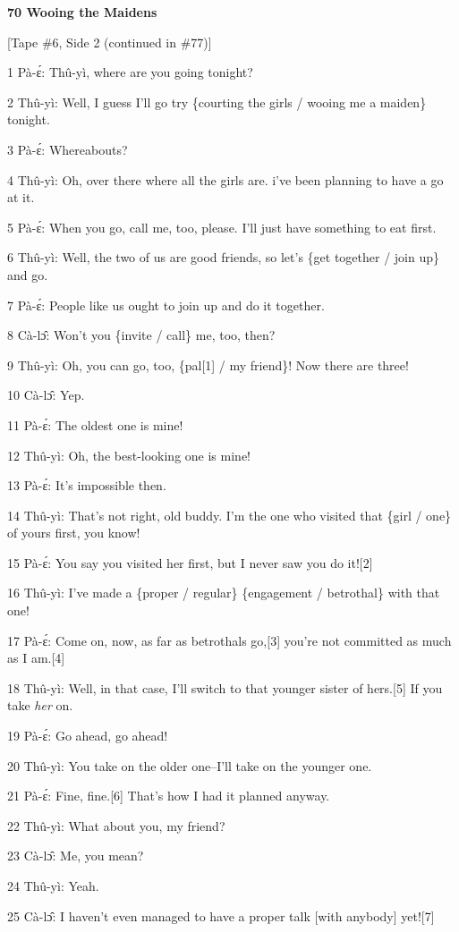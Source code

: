 
\textbf{70 Wooing the Maidens}

[Tape \#6, Side 2 (continued in \#77)]

1 Pà-ɛ́: Thû-yì, where are you going tonight?

2 Thû-yì: Well, I guess I'll go try \{courting the girls / wooing me a maiden\}
tonight.

3 Pà-ɛ́: Whereabouts?

4 Thû-yì: Oh, over there where all the girls are. i've been planning to have
a go at it.

5 Pà-ɛ́: When you go, call me, too, please. I'll just have something to eat
first.

6 Thû-yì: Well, the two of us are good friends, so let's \{get together / join
up\} and go.

7 Pà-ɛ́: People like us ought to join up and do it together.

8 Cà-lɔ̂: Won't you \{invite / call\} me, too, then?

9 Thû-yì: Oh, you can go, too, \{pal[1] / my friend\}! Now there are three!

10 Cà-lɔ̂: Yep.

11 Pà-ɛ́: The oldest one is mine!

12 Thû-yì: Oh, the best-looking one is mine!

13 Pà-ɛ́: It's impossible then.

14 Thû-yì: That's not right, old buddy. I'm the one who visited that \{girl /
one\} of yours first, you know!

15 Pà-ɛ́: You say you visited her first, but I never saw you do it![2]

16 Thû-yì: I've made a \{proper / regular\} \{engagement / betrothal\} with that
one!

17 Pà-ɛ́: Come on, now, as far as betrothals go,[3] you're not committed as
much as I am.[4]

18 Thû-yì: Well, in that case, I'll switch to that younger sister of hers.[5]
If you take \textit{her} on.

19 Pà-ɛ́: Go ahead, go ahead!

20 Thû-yì: You take on the older one--I'll take on the younger one.

21 Pà-ɛ́: Fine, fine.[6] That's how I had it planned anyway.

22 Thû-yì: What about you, my friend?

23 Cà-lɔ̂: Me, you mean?

24 Thû-yì: Yeah.

25 Cà-lɔ̂: I haven't even managed to have a proper talk [with anybody] yet![7]

